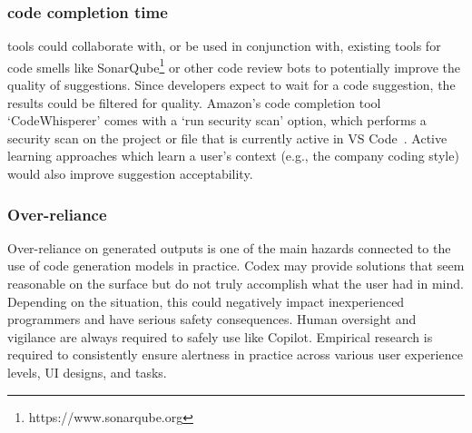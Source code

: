 \subsubsection{code completion time}
\AISE{} tools could collaborate with, or be used in conjunction with, existing tools for code smells like SonarQube\footnote{https://www.sonarqube.org} or other code review bots to potentially improve the quality of suggestions. Since developers expect to wait for a code suggestion, the results could be filtered for quality. 
Amazon's code completion tool `CodeWhisperer' comes with a `run security scan' option, which performs a security scan on the project or file that is currently active in VS Code~\cite{amazon}.
Active learning approaches which learn a user's context (e.g., the company coding style) would also improve suggestion acceptability. %


\subsubsection{Over-reliance}
Over-reliance on generated outputs is one of the main hazards connected to the use of code generation models in practice.
Codex may provide solutions that seem reasonable on the surface but do not truly accomplish what the user had in mind. Depending on the situation, this could negatively impact inexperienced programmers and have serious safety consequences. Human oversight and vigilance are always required to safely use \cct{} like Copilot.
Empirical research is required to consistently ensure alertness in practice across various user experience levels, UI designs, and tasks.


